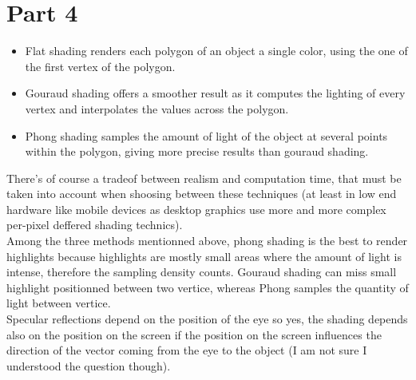 \section{Part 4}


\begin{itemize}
    \item Flat shading renders each polygon of an object a single color, using
    the one of the first vertex of the polygon.
    \item Gouraud shading offers a smoother result as it computes the lighting of
    every vertex and interpolates the values across the polygon.
    \item Phong shading samples the amount of light of the object at several points
    within the polygon, giving more precise results than gouraud shading.
\end{itemize}
There's of course a tradeof between realism and computation time, that must be taken
into account when shoosing between these techniques (at least in low end hardware
like mobile devices as desktop graphics use more and more complex per-pixel deffered
shading technics).\\
Among the three methods mentionned above, phong shading is the best to render highlights
because highlights are mostly small areas where the amount of light is intense,
therefore the sampling density counts. Gouraud shading can miss small highlight
positionned between two vertice, whereas Phong samples the quantity of light between
vertice. \\
Specular reflections depend on the position of the eye so yes, the shading
depends also on the position on the screen if the position on the screen influences
the direction of the vector coming from the eye to the object (I am not sure I understood the question though).

